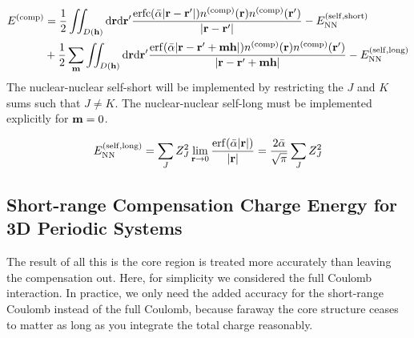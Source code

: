 \documentclass[paper=a4, fontsize=11pt]{article} %
\numberwithin{equation}{section} %
\numberwithin{figure}{section} %
\numberwithin{table}{section} %
\newcommand{\bh}{{\bf{h}}}
\newcommand{\bm}{{\bf{m}}}
\newcommand{\br}{{\bf{r}}}
\newcommand{\rNN}{{\mathrm{NN}}}
\newcommand{\rself}{{\mathrm{self}}}
\newcommand{\rshort}{{\mathrm{short}}}
\newcommand{\rlong}{{\mathrm{long}}}
\newcommand{\rerf}{{\mathrm{erf}}}
\newcommand{\rerfc}{{\mathrm{erfc}}}
\newcommand{\rd}{{\mathrm{d}}}
\newcommand{\rcomp}{{\mathrm{comp}}}
\newcommand{\al}{{\alpha}}
\newcommand{\bal}{{\bar{\alpha}}}
\begin{document}
\begin{equation}
\begin{split}
E^{(\rcomp)} 
&= \frac{1}{2}\iint_{D(\bh)} \rd \br \rd \br' \frac{\rerfc(\bal |\br-\br'|)n^{(\rcomp)}(\br)n^{(\rcomp)}(\br')}{|\br-\br'|} - E_{\rNN}^{(\rself,\rshort)} \\
&+ \frac{1}{2}\sum_\bm \iint_{D(\bh)} \rd \br \rd \br' \frac{\rerf(\bal |\br-\br'+\bm\bh|)n^{(\rcomp)}(\br)n^{(\rcomp)}(\br')}{|\br-\br'+\bm\bh|} - E_{\rNN}^{(\rself,\rlong)} \\
\end{split}
\end{equation}
The nuclear-nuclear self-short will be implemented by restricting the $J$ and $K$ sums such that $J \neq K$. The nuclear-nuclear self-long must be implemented explicitly for $\bm = 0$.

\begin{equation}
\begin{split}
E_{\rNN}^{(\rself,\rlong)}
&=\sum_J Z_J^2 \lim_{\br \rightarrow 0}\frac{\rerf(\bar {\al}|\br|)}{|\br|} = \frac{2\bal}{\sqrt{\pi}} \sum_J Z_J^2  \\
\end{split}
\end{equation}

\subsection{Short-range Compensation Charge Energy for 3D Periodic Systems}
The result of all this is the core region is treated more accurately than leaving the compensation out. Here, for simplicity we considered the full Coulomb interaction. In practice, we only need the added accuracy for the short-range Coulomb instead of the full Coulomb, because faraway the core structure ceases to matter as long as you integrate the total charge reasonably. 
\end{document}
